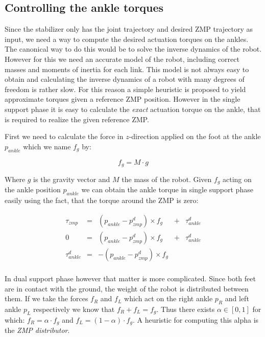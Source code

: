 \documentclass[english,ngerman]{KITreprt}
\begin{document}
\subsection{Controlling the ankle
torques}\label{controlling-the-ankle-torques}

Since the stabilizer only has the joint trajectory and desired ZMP
trajectory as input, we need a way to compute the desired actuation
torques on the ankles. The canonical way to do this would be to solve
the inverse dynamics of the robot. However for this we need an accurate
model of the robot, including correct masses and moments of inertia for
each link. This model is not always easy to obtain and calculating the
inverse dynamics of a robot with many degrees of freedom is rather slow.
For this reason a simple heuristic is proposed to yield approximate
torques given a reference ZMP position. However in the single support
phase it is easy to calculate the \emph{exact} actuation torque on the
ankle, that is required to realize the given reference ZMP.

First we need to calculate the force in $z$-direction applied on the
foot at the ankle $p_{ankle}$ which we name $f_g$ by:

\begin{equation}
f_g = M \cdot g
\end{equation}

Where $g$ is the gravity vector and $M$ the mass of the robot. Given
$f_g$ acting on the ankle position $p_{ankle}$ we can obtain the ankle
torque in single support phase easily using the fact, that the torque
around the ZMP is zero:

\begin{equation}
\begin{array}{lcccr}
\tau_{zmp} & = & (p_{ankle} - p^d_{zmp}) \times f_g & + & \tau^d_{ankle} \\
0 & = & (p_{ankle} - p^d_{zmp}) \times f_g & + & \tau^d_{ankle} \\
\tau^d_{ankle} & = & -(p_{ankle} - p^d_{zmp}) \times f_g & & \\
\end{array}
\end{equation}

In dual support phase however that matter is more complicated. Since
both feet are in contact with the ground, the weight of the robot is
distributed between them. If we take the forces $f_R$ and $f_L$ which
act on the right ankle $p_R$ and left ankle $p_L$ respectively we know
that $f_R + f_L = f_g$. Thus there exists $\alpha \in [0, 1]$ for which:
$f_R = \alpha \cdot f_g$ and $f_L = (1-\alpha) \cdot f_g$. A heuristic
for computing this alpha is the \emph{ZMP distributor}.
\end{document}
